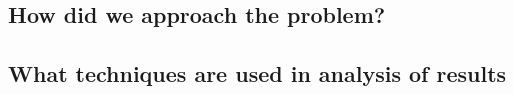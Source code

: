 \documentclass{article}
\begin{document}
\subsection{How did we approach the problem?}

\subsection{What techniques are used in analysis of results}

\end{document}
